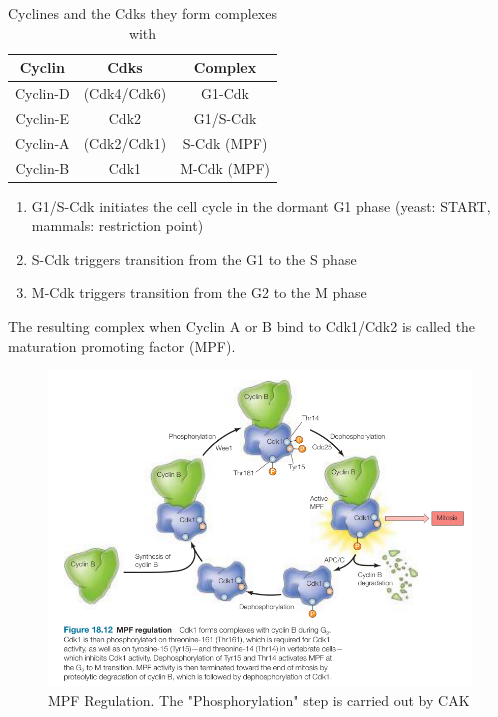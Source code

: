 \documentclass{article}
\begin{document}
	\begin{table}[h]
		\centering
		\begin{tabular}{|c|c|c|} \hline
			Cyclin & Cdks & Complex \\ \hline
			Cyclin-D & (Cdk4/Cdk6)  & G1-Cdk \\ \hline
			Cyclin-E & Cdk2         & G1/S-Cdk \\ \hline
			Cyclin-A & (Cdk2/Cdk1)  & S-Cdk (MPF) \\ \hline
			Cyclin-B & Cdk1         & M-Cdk (MPF)\\ \hline
		\end{tabular}
		\caption{Cyclines and the Cdks they form complexes with}
	\end{table}

	\begin{enumerate}[label=\textbullet]
		\item G1/S-Cdk initiates the cell cycle in the dormant G1 phase  (yeast: START, mammals: restriction point)
		\item S-Cdk triggers transition from the G1 to the S phase 
		\item M-Cdk triggers transition from the G2 to the M phase 
	\end{enumerate}

	The resulting complex when Cyclin A or B bind to Cdk1/Cdk2 is called the maturation promoting factor (MPF).
	
	\begin{figure}[H]
		\centering
		\includegraphics[width=\linewidth]{mpf_regulation_cooper.png}
		\caption{MPF Regulation. The "Phosphorylation" step is carried out by CAK}
	\end{figure}
\end{document}
